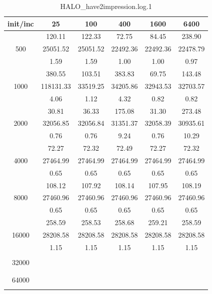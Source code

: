 {\begin{table}[th]
\caption{HALO\_have2impression.log.1}
\label{tab:HALO_have2impression.log.1}
\centering
\begin{tabular}{|c||c|c|c|c|c|}
\hline
init/inc & 25 & 100 & 400 & 1600 & 6400 \\ \hline \hline
  & 120.11 & 122.33 & 72.75 & 84.45 & 238.90\\ 
500  & 25051.52 & 25051.52 & 22492.36 & 22492.36 & 22478.79\\ 
  & 1.59 & 1.59 & 1.00 & 1.00 & 0.97\\ \hline 
  & 380.55 & 103.51 & 383.83 & 69.75 & 143.48\\ 
1000  & 118131.33 & 33519.25 & 34205.86 & 32943.53 & 32703.57\\ 
  & 4.06 & 1.12 & 4.32 & 0.82 & 0.82\\ \hline 
  & 30.81 & 36.33 & 175.08 & 31.30 & 273.48\\ 
2000  & 32056.85 & 32056.84 & 31351.37 & 32058.39 & 30935.61\\ 
  & 0.76 & 0.76 & 9.24 & 0.76 & 10.29\\ \hline 
  & 72.27 & 72.32 & 72.49 & 72.27 & 72.32\\ 
4000  & 27464.99 & 27464.99 & 27464.99 & 27464.99 & 27464.99\\ 
  & 0.65 & 0.65 & 0.65 & 0.65 & 0.65\\ \hline 
  & 108.12 & 107.92 & 108.14 & 107.95 & 108.19\\ 
8000  & 27460.96 & 27460.96 & 27460.96 & 27460.96 & 27460.96\\ 
  & 0.65 & 0.65 & 0.65 & 0.65 & 0.65\\ \hline 
  & 258.59 & 258.53 & 258.68 & 259.21 & 258.59\\ 
16000  & 28208.58 & 28208.58 & 28208.58 & 28208.58 & 28208.58\\ 
  & 1.15 & 1.15 & 1.15 & 1.15 & 1.15\\ \hline 
  &  &  &  &  & \\ 
32000  &  &  &  &  & \\ 
  &  &  &  &  & \\ \hline 
  &  &  &  &  & \\ 
64000  &  &  &  &  & \\ 
  &  &  &  &  & \\ \hline 
\end{tabular}
\end{table}

}

